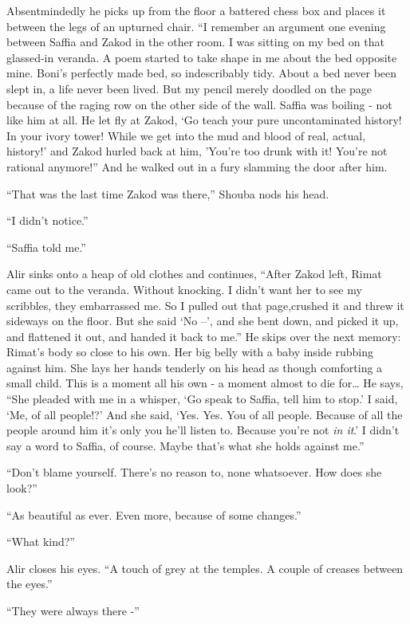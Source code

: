 \documentclass[twoside,11pt]{book}
\begin{document}
Absentmindedly he picks up from the floor a battered chess box and places it between the legs of an upturned chair.
``I remember an argument one evening between Saffia and Zakod in the other room. I was sitting on my bed
on that glassed-in veranda. A poem started to take shape in me about the bed opposite mine.  Boni's perfectly made bed,
so indescribably tidy. About a bed never been slept in, a life never been lived. But my pencil merely doodled on the
page because of the raging row on the other side of the wall. Saffia was boiling - not like him at all. He let fly
at Zakod, `Go teach your pure uncontaminated history! In your ivory tower! While we get into the mud and blood of real,
actual, history!' and Zakod hurled back at him, 'You're too drunk with it! You're not rational anymore!''
And he walked out in a fury slamming the door after him.

``That was the last time Zakod was there,'' Shouba nods his head.

``I didn't notice.''

``Saffia told me.''

Alir sinks onto a heap of old clothes and continues,
``After Zakod left, Rimat came out to the veranda.
Without knocking. I didn't want her to see my scribbles, they embarrassed me. So I pulled out that page,crushed it
and threw it sideways on the floor. But she said `No --', and she bent down, and picked it up, and flattened it out,
 and handed it back to me.'' He skips over the next memory: Rimat's body so close to his own. Her big
belly with a baby inside rubbing against him. She lays her hands tenderly on his head as though comforting a small
child. This is a moment all his own - a moment almost to die for{\dots} He says, ``She pleaded with me
in a whisper, `Go speak to Saffia, tell him to stop.' I said, `Me, of all people!?' And she said, `Yes. Yes. You of
all people. Because of all the people around him it's only you he'll listen to. Because you're not \textit{in it}.' I
didn't say a word to Saffia, of course. Maybe that's what she holds against me.''

``Don't blame yourself. There's no reason to, none whatsoever.  How does she look?''

``As beautiful as ever. Even more, because of some changes.''

``What kind?''

Alir closes his eyes. ``A touch of grey at the temples. A couple of creases between the
eyes.''

``They were always there -''
\end{document}
